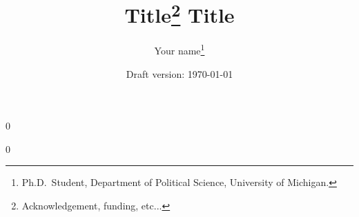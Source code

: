 \documentclass[12pt%
]{article}
\newcommand{\blind}{0}
\theoremstyle{break}
\begin{document}
\newcommand\spacingset[1]{\renewcommand{\baselinestretch}%
{#1}\small\normalsize}

\spacingset{1.1}


\newcommand{\tit}{\bf Title}

\blind
{
\title{\tit\thanks{
  Acknowledgement, funding, etc... 
}
}

\author{
 Your name\footnotemark[1] \thanks{
    Ph.D.~Student, Department of Political Science, University of Michigan.
    }
}

\date{
Draft version: \today
}

\maketitle
}

\blind \title{\bf \tit} \maketitle
\fi


\thispagestyle{empty}
\setcounter{page}{0}

\begin{abstract}

\end{abstract}

\clearpage %

\onehalfspacing






\clearpage
\nocite{*} %

\clearpage
\appendix

\end{document}
